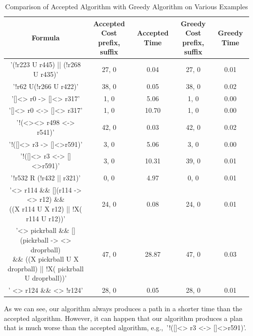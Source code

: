 \begin{landscape}
\begin{table}[]
\centering
\small
\begin{tabular}{|c|c|c|c|c|}
\hline
Formula & \makecell{Accepted Cost \\ prefix, suffix} & Accepted Time & \makecell{Greedy Cost \\ prefix, suffix} & Greedy Time \\ \hline
     '(!r223 U r445) || (!r268 U r435)'  &         27, 0     &      0.04         &      27, 0   &     0.01     \\ \hline
      '!r62 U(!r266 U r422)'  &         38, 0     &       0.05        &     38, 0     &     0.02     \\ \hline
       '[]<> r0 -> []<> r317' &         1, 0      &       5.06        &    1, 0      &    0.00     \\ \hline
       '[]<> r0 <-> []<> r317'  & 1, 0		&		10.70		& 1, 0 	&  0.00 \\ \hline 
      '!(<><> r498 <-> r541)' &	42, 0	&	0.03	&	42, 0	&	0.02	\\		\hline
      '!([]<> r3 -> []<>r591)' &	 3, 0	&	5.06 	&	3, 0 	&	0.00	\\		\hline
      '!([]<> r3 <-> []<>r591)' &	 3, 0	&	10.31	&	39, 0	&	0.01	\\		\hline
      '!r532 R (!r432 || r321)' &	 0, 0	&	4.97 	&	0, 0	&	0.01 	\\		\hline
     \makecell{ '<> r114 \&\& [](r114 -> <> r12) \&\& \\((X r114 U X r12) || !X( r114 U r12))' }&	 24, 0	&	0.08 	&	24, 0	&	0.01	\\		\hline
   \makecell{ '<> pickrball \&\& [](pickrball -> <> droprball) \\ \&\& ((X pickrball U X droprball) || !X( pickrball U droprball))' } &	47, 0	&	28.87	&	47, 0	&	0.03	\\		\hline
      ' <> r124 \&\& <> !r124' &	28, 0	&	0.05 	&	28, 0	&	0.01	\\		\hline
\end{tabular}
\caption{Comparison of Accepted Algorithm with Greedy Algorithm on Various Examples}
\label{table}
\end{table}
\end{landscape}

As we can see, our algorithm always produces a path in a shorter time than the accepted algorithm. However, it can happen that our algorithm produces a plan that is much worse than the accepted algorithm, e.g.,\ '!([]<> r3 <-> []<>r591)'. 



